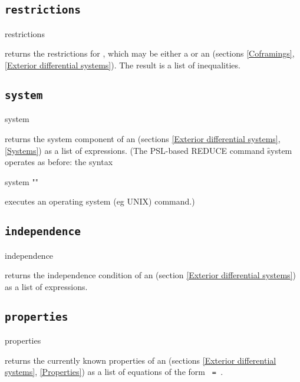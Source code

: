 \subsection{\tt restrictions}
\label{restrictions}

\begin{syntax}
	restrictions 
\end{syntax}
returns the restrictions for , which may be either a
 or an  (sections \ref{Coframings}, \ref{Exterior
differential systems}). The result is a list of inequalities.

\subsection{\tt system}
\label{system}

\begin{syntax}
	system 
\end{syntax}
returns the system component of an  (sections \ref{Exterior
differential systems}, \ref{Systems}) as a list of 
expressions. (The PSL-based REDUCE command \f{system} operates as before:
the syntax
\begin{syntax}
	system ""
\end{syntax}
executes an operating system (eg UNIX) command.)

\subsection{\tt independence}
\label{independence}

\begin{syntax}
	independence 
\end{syntax}
returns the independence condition of an  (section \ref{Exterior
differential systems}) as a list of  expressions.


\subsection{\tt properties}
\label{properties}

\begin{syntax}
	properties 
\end{syntax}
returns the currently known properties of an  (sections
\ref{Exterior differential systems}, \ref{Properties}) as a list of
equations of the form {\tt{} = }.

